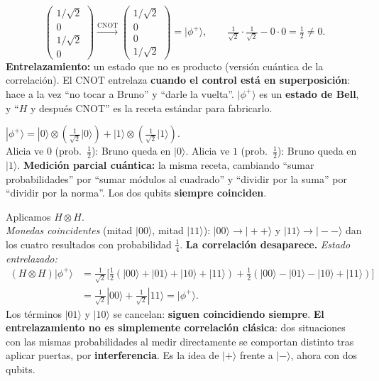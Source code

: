 \documentclass[11pt, a4paper, twoside, openright]{report}
\begin{document}
{\[ \begin{pmatrix}1/\sqrt2\\0\\1/\sqrt2\\0\end{pmatrix} \xrightarrow{\text{CNOT}} \begin{pmatrix}1/\sqrt2\\0\\0\\1/\sqrt2\end{pmatrix} = |\phi^+\rangle, \qquad \tfrac{1}{\sqrt2}\cdot\tfrac{1}{\sqrt2} - 0\cdot0 = \tfrac12 \neq 0. \]}
{\textbf{Entrelazamiento:} un estado que no es producto (versión cuántica de la correlación). El CNOT entrelaza \textbf{cuando el control está en superposición}: hace a la vez ``no tocar a Bruno'' y ``darle la vuelta''. $|\phi^+\rangle$ es un \textbf{estado de Bell}, y ``$H$ y después CNOT'' es la receta estándar para fabricarlo.}

{$|\phi^+\rangle = |0\rangle\otimes\left(\tfrac{1}{\sqrt2}|0\rangle\right) + |1\rangle\otimes\left(\tfrac{1}{\sqrt2}|1\rangle\right)$. \\
Alicia ve $0$ (prob.\ $\frac12$): Bruno queda en $|0\rangle$. \quad Alicia ve $1$ (prob.\ $\frac12$): Bruno queda en $|1\rangle$.}
{\textbf{Medición parcial cuántica:} la misma receta, cambiando ``sumar probabilidades'' por ``sumar módulos al cuadrado'' y ``dividir por la suma'' por ``dividir por la norma''. Los dos qubits \textbf{siempre coinciden}.}

{Aplicamos $H\otimes H$. \\
\textit{Monedas coincidentes} (mitad $|00\rangle$, mitad $|11\rangle$): $|00\rangle\to|{+}{+}\rangle$ y $|11\rangle\to|{-}{-}\rangle$ dan los cuatro resultados con probabilidad $\frac14$. \textbf{La correlación desaparece.}
\textit{Estado entrelazado:}
\begin{align*} (H\otimes H)|\phi^+\rangle &= \tfrac{1}{\sqrt2}\Big[\tfrac12(|00\rangle{+}|01\rangle{+}|10\rangle{+}|11\rangle) + \tfrac12(|00\rangle{-}|01\rangle{-}|10\rangle{+}|11\rangle)\Big] \\ &= \tfrac{1}{\sqrt2}|00\rangle + \tfrac{1}{\sqrt2}|11\rangle = |\phi^+\rangle. \end{align*}
Los términos $|01\rangle$ y $|10\rangle$ se cancelan: \textbf{siguen coincidiendo siempre}.}
{\textbf{El entrelazamiento no es simplemente correlación clásica}: dos situaciones con las mismas probabilidades al medir directamente se comportan distinto tras aplicar puertas, por \textbf{interferencia}. Es la idea de $|+\rangle$ frente a $|-\rangle$, ahora con dos qubits.}
\end{document}
